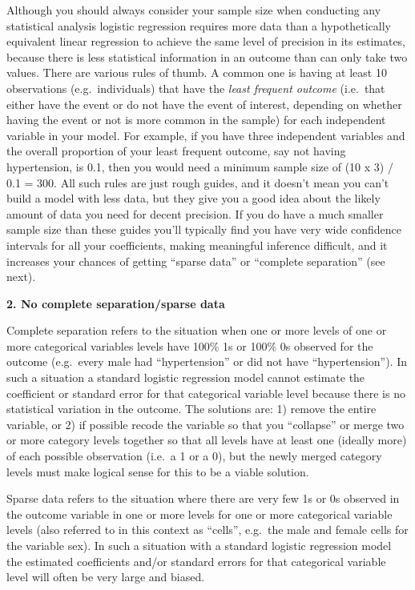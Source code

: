 \documentclass[
]{book}
\begin{document}
Although you should always consider your sample size when conducting any statistical analysis logistic regression requires more data than a hypothetically equivalent linear regression to achieve the same level of precision in its estimates, because there is less statistical information in an outcome than can only take two values. There are various rules of thumb. A common one is having at least 10 observations (e.g.~individuals) that have the \emph{least frequent outcome} (i.e.~that either have the event or do not have the event of interest, depending on whether having the event or not is more common in the sample) for each independent variable in your model. For example, if you have three independent variables and the overall proportion of your least frequent outcome, say not having hypertension, is 0.1, then you would need a minimum sample size of (10 x 3) / 0.1 = 300. All such rules are just rough guides, and it doesn't mean you can't build a model with less data, but they give you a good idea about the likely amount of data you need for decent precision. If you do have a much smaller sample size than these guides you'll typically find you have very wide confidence intervals for all your coefficients, making meaningful inference difficult, and it increases your chances of getting ``sparse data'' or ``complete separation'' (see next).

\textbf{2. No complete separation/sparse data}

Complete separation refers to the situation when one or more levels of one or more categorical variables levels have 100\% 1s or 100\% 0s observed for the outcome (e.g.~every male had ``hypertension'' or did not have ``hypertension''). In such a situation a standard logistic regression model cannot estimate the coefficient or standard error for that categorical variable level because there is no statistical variation in the outcome. The solutions are: 1) remove the entire variable, or 2) if possible recode the variable so that you ``collapse'' or merge two or more category levels together so that all levels have at least one (ideally more) of each possible observation (i.e.~a 1 or a 0), but the newly merged category levels must make logical sense for this to be a viable solution.

Sparse data refers to the situation where there are very few 1s or 0s observed in the outcome variable in one or more levels for one or more categorical variable levels (also referred to in this context as ``cells'', e.g.~the male and female cells for the variable sex). In such a situation with a standard logistic regression model the estimated coefficients and/or standard errors for that categorical variable level will often be very large and biased.
\end{document}
